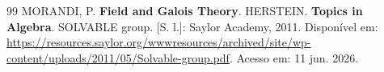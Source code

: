 \documentclass[12pt, a4paper]{article}
\theoremstyle{definition}
\begin{document}
\begin{thebibliography}{99}
	 MORANDI, P. \textbf{Field and Galois Theory}.
	 HERSTEIN. \textbf{Topics in Algebra}.
	SOLVABLE group. [S. l.]: Saylor Academy, 2011. Disponível em: \url{https://resources.saylor.org/wwwresources/archived/site/wp-content/uploads/2011/05/Solvable-group.pdf}. Acesso em: 11 jun. 2026.
\end{thebibliography}
\end{document}
